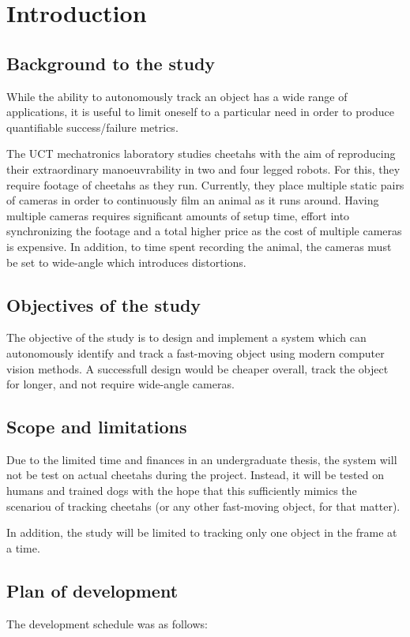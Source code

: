 \section{Introduction}
\subsection{Background to the study}

While the ability to autonomously track an object has a wide range of applications, it is useful to limit oneself to a particular need in order to produce quantifiable success/failure metrics.

The UCT mechatronics laboratory studies cheetahs with the aim of reproducing their extraordinary manoeuvrability in two and four legged robots. For this, they require footage of cheetahs as they run. Currently, they place multiple static pairs of cameras in order to continuously film an animal as it runs around. Having multiple cameras requires significant amounts of setup time, effort into synchronizing the footage and a total higher price as the cost of multiple cameras is expensive. In addition, to time spent recording the animal, the cameras must be set to wide-angle which introduces distortions.


\subsection{Objectives of the study}
The objective of the study is to design and implement a system which can autonomously identify and track a fast-moving object using modern computer vision methods. A successfull design would be cheaper overall, track the object for longer, and not require wide-angle cameras.


\subsection{Scope and limitations}
Due to the limited time and finances in an undergraduate thesis, the system will not be test on actual cheetahs during the project. Instead, it will be tested on humans and trained dogs with the hope that this sufficiently mimics the scenariou of tracking cheetahs (or any other fast-moving object, for that matter).

In addition, the study will be limited to tracking only one object in the frame at a time.


\subsection{Plan of development}
The development schedule was as follows:

